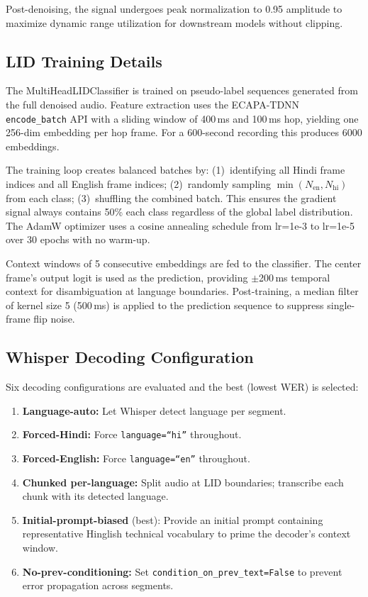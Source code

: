 \documentclass[11pt]{article}
\begin{document}
Post-denoising, the signal undergoes peak normalization to 0.95 amplitude
to maximize dynamic range utilization for downstream models without clipping.

\subsection{LID Training Details}

The MultiHeadLIDClassifier is trained on pseudo-label sequences generated
from the full denoised audio. Feature extraction uses the ECAPA-TDNN
\texttt{encode\_batch} API with a sliding window of 400\,ms and 100\,ms hop,
yielding one 256-dim embedding per hop frame. For a 600-second recording
this produces 6000 embeddings.

The training loop creates balanced batches by: (1)~identifying all Hindi
frame indices and all English frame indices; (2)~randomly sampling
$\min(N_{\text{en}}, N_{\text{hi}})$ from each class; (3)~shuffling the
combined batch. This ensures the gradient signal always contains 50\% each
class regardless of the global label distribution. The AdamW optimizer uses
a cosine annealing schedule from lr=1e-3 to lr=1e-5 over 30 epochs with
no warm-up.

Context windows of 5 consecutive embeddings are fed to the classifier.
The center frame's output logit is used as the prediction, providing
$\pm$200\,ms temporal context for disambiguation at language boundaries.
Post-training, a median filter of kernel size 5 (500\,ms) is applied to
the prediction sequence to suppress single-frame flip noise.

\subsection{Whisper Decoding Configuration}

Six decoding configurations are evaluated and the best (lowest WER)
is selected:
\begin{enumerate}
  \item \textbf{Language-auto:} Let Whisper detect language per segment.
  \item \textbf{Forced-Hindi:} Force \texttt{language=``hi''} throughout.
  \item \textbf{Forced-English:} Force \texttt{language=``en''} throughout.
  \item \textbf{Chunked per-language:} Split audio at LID boundaries;
        transcribe each chunk with its detected language.
  \item \textbf{Initial-prompt-biased} (best): Provide an initial prompt
        containing representative Hinglish technical vocabulary to prime
        the decoder's context window.
  \item \textbf{No-prev-conditioning:} Set \texttt{condition\_on\_prev\_text=False}
        to prevent error propagation across segments.
\end{enumerate}
\end{document}
